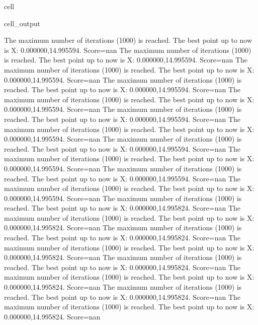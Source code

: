 \documentclass[letterpaper,10pt,english]{jupyterBook}
\begin{document}
\begin{sphinxuseclass}{cell}
\begin{sphinxVerbatimOutput}
\begin{sphinxuseclass}{cell_output}
\begin{sphinxVerbatim}[commandchars=\\\{\}]
The maximum number of iterations (1000) is reached. The best point up to now is X: \PYGZob{}0.000000,14.995594\PYGZcb{}. Score=\PYGZhy{}nan
The maximum number of iterations (1000) is reached. The best point up to now is X: \PYGZob{}0.000000,14.995594\PYGZcb{}. Score=\PYGZhy{}nan
The maximum number of iterations (1000) is reached. The best point up to now is X: \PYGZob{}0.000000,14.995594\PYGZcb{}. Score=\PYGZhy{}nan
The maximum number of iterations (1000) is reached. The best point up to now is X: \PYGZob{}0.000000,14.995594\PYGZcb{}. Score=\PYGZhy{}nan
The maximum number of iterations (1000) is reached. The best point up to now is X: \PYGZob{}0.000000,14.995594\PYGZcb{}. Score=\PYGZhy{}nan
The maximum number of iterations (1000) is reached. The best point up to now is X: \PYGZob{}0.000000,14.995594\PYGZcb{}. Score=\PYGZhy{}nan
The maximum number of iterations (1000) is reached. The best point up to now is X: \PYGZob{}0.000000,14.995594\PYGZcb{}. Score=\PYGZhy{}nan
The maximum number of iterations (1000) is reached. The best point up to now is X: \PYGZob{}0.000000,14.995594\PYGZcb{}. Score=\PYGZhy{}nan
The maximum number of iterations (1000) is reached. The best point up to now is X: \PYGZob{}0.000000,14.995594\PYGZcb{}. Score=\PYGZhy{}nan
The maximum number of iterations (1000) is reached. The best point up to now is X: \PYGZob{}0.000000,14.995594\PYGZcb{}. Score=\PYGZhy{}nan
The maximum number of iterations (1000) is reached. The best point up to now is X: \PYGZob{}0.000000,14.995594\PYGZcb{}. Score=\PYGZhy{}nan
The maximum number of iterations (1000) is reached. The best point up to now is X: \PYGZob{}0.000000,14.995824\PYGZcb{}. Score=\PYGZhy{}nan
The maximum number of iterations (1000) is reached. The best point up to now is X: \PYGZob{}0.000000,14.995824\PYGZcb{}. Score=\PYGZhy{}nan
The maximum number of iterations (1000) is reached. The best point up to now is X: \PYGZob{}0.000000,14.995824\PYGZcb{}. Score=\PYGZhy{}nan
The maximum number of iterations (1000) is reached. The best point up to now is X: \PYGZob{}0.000000,14.995824\PYGZcb{}. Score=\PYGZhy{}nan
The maximum number of iterations (1000) is reached. The best point up to now is X: \PYGZob{}0.000000,14.995824\PYGZcb{}. Score=\PYGZhy{}nan
The maximum number of iterations (1000) is reached. The best point up to now is X: \PYGZob{}0.000000,14.995824\PYGZcb{}. Score=\PYGZhy{}nan
The maximum number of iterations (1000) is reached. The best point up to now is X: \PYGZob{}0.000000,14.995824\PYGZcb{}. Score=\PYGZhy{}nan
The maximum number of iterations (1000) is reached. The best point up to now is X: \PYGZob{}0.000000,14.995824\PYGZcb{}. Score=\PYGZhy{}nan

\end{sphinxVerbatim}
\end{sphinxuseclass}
\end{sphinxVerbatimOutput}
\end{sphinxuseclass}
\end{document}
